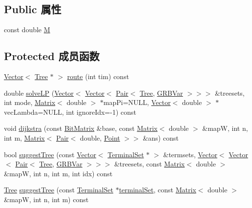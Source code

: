 \subsection*{Public 属性}
\begin{DoxyCompactItemize}
\item 
const double \hyperlink{classColumnGenSolve_ac5abb4d6dfd291b01af6ea006b5f9f5d}{M}
\end{DoxyCompactItemize}
\subsection*{Protected 成员函数}
\begin{DoxyCompactItemize}
\item 
\hyperlink{classVector}{Vector}$<$ \hyperlink{classTree}{Tree} $\ast$ $>$ \hyperlink{classColumnGenSolve_af97cd5f1c4a7305b72e46971fdb85002}{route} (int tim) const 
\item 
double \hyperlink{classColumnGenSolve_aadb23efa531a3eb68651ba11f4d36c81}{solve\+LP} (\hyperlink{classVector}{Vector}$<$ \hyperlink{classVector}{Vector}$<$ \hyperlink{classPair}{Pair}$<$ \hyperlink{classTree}{Tree}, \hyperlink{classGRBVar}{G\+R\+B\+Var} $>$$>$$>$ \&treesets, int mode, \hyperlink{classMatrix}{Matrix}$<$ double $>$ $\ast$map\+Pi=N\+U\+LL, \hyperlink{classVector}{Vector}$<$ double $>$ $\ast$vec\+Lambda=N\+U\+LL, int ignore\+Idx=-\/1) const 
\item 
void \hyperlink{classColumnGenSolve_a71007959556061091171c03da6197f34}{dijkstra} (const \hyperlink{classBitMatrix}{Bit\+Matrix} \&base, const \hyperlink{classMatrix}{Matrix}$<$ double $>$ \&mapW, int n, int m, \hyperlink{classMatrix}{Matrix}$<$ \hyperlink{classPair}{Pair}$<$ double, \hyperlink{classPoint}{Point} $>$$>$ \&ans) const 
\item 
bool \hyperlink{classColumnGenSolve_a4ec729b2184612495e657f7ec2d644fa}{suggest\+Tree} (const \hyperlink{classVector}{Vector}$<$ \hyperlink{classTerminalSet}{Terminal\+Set} $\ast$ $>$ \&termsets, \hyperlink{classVector}{Vector}$<$ \hyperlink{classVector}{Vector}$<$ \hyperlink{classPair}{Pair}$<$ \hyperlink{classTree}{Tree}, \hyperlink{classGRBVar}{G\+R\+B\+Var} $>$$>$$>$ \&treesets, const \hyperlink{classMatrix}{Matrix}$<$ double $>$ \&mapW, int n, int m, int idx) const 
\item 
\hyperlink{classTree}{Tree} \hyperlink{classColumnGenSolve_a9f9ca7d65c0e42d18ea422ff136d52d0}{suggest\+Tree} (const \hyperlink{classTerminalSet}{Terminal\+Set} $\ast$\hyperlink{classes_8txt_a597568d74a60fa533165215be11d5f0b}{terminal\+Set}, const \hyperlink{classMatrix}{Matrix}$<$ double $>$ \&mapW, int n, int m) const 
$$
\end{DoxyCompactItemize}
